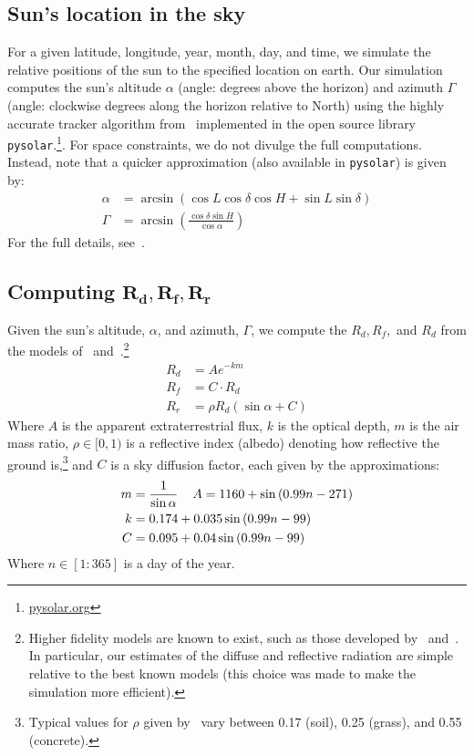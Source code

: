 \documentclass{article}
\begin{document}
{%
\subsection{Sun's location in the sky}
For a given latitude, longitude, year, month, day, and time, we simulate the relative positions of the sun to the specified location on earth. Our simulation computes the sun's altitude $\alpha$ (angle: degrees above the horizon) and azimuth $\Gamma$ (angle: clockwise degrees along the horizon relative to North) using the highly accurate tracker algorithm from~\citet{reda2004solar} implemented in the open source library \texttt{pysolar}.\footnote{\url{pysolar.org}}. For space constraints, we do not divulge the full computations. Instead, note that a quicker approximation (also available in \texttt{pysolar}) is given by:
\begin{align}
\alpha &= \arcsin(\cos L \cos \delta \cos H + \sin L \sin \delta)\\
\Gamma &= \arcsin\left(\frac{\cos \delta \sin H}{\cos \alpha}\right)
\end{align}
For the full details, see~\citet{reda2004solar}.

\subsection{Computing $\pmb{R_d, R_f, R_r}$}
Given the sun's altitude, $\alpha$, and azimuth, $\Gamma$, we compute the $R_d, R_f,$ and $R_d$ from the models of~\citet{threlkeld1957direct,Liu1960} and~\citet{masters2013renewable}.\footnote{Higher fidelity models are known to exist, such as those developed by~\citet{andersen1980comments,klein1977calculation} and~\citet{kamali2006estimating}. In particular, our estimates of the diffuse and reflective radiation are simple relative to the best known models (this choice was made to make the simulation more efficient).}
\begin{align}
R_d &= A e^{-km} \\
R_f &= C \cdot R_d \\
R_r &= \rho R_d (\sin \alpha + C)
\end{align}
Where $A$ is the apparent extraterrestrial flux, $k$ is the optical depth, $m$ is the air mass ratio, $\rho \in [0,1)$ is a reflective index (albedo) denoting how reflective the ground is,\footnote{Typical values for $\rho$ given by~\citet{mcevoy2003practical} vary between 0.17 (soil), 0.25 (grass), and 0.55 (concrete).} and $C$ is a sky diffusion factor, each given by the approximations:
\begin{align}
m&=\frac{1}{\sin \alpha} \hspace{4mm} A = 1160 + \sin \left(0.99 n- 271\right)\\
k&=0.174 + 0.035 \sin\left( 0.99 n - 99\right)\\
C&=0.095 + 0.04 \sin\left(0.99 n-99\right)
\end{align}
Where $n \in [1:365]$ is a day of the year.

}
\end{document}
